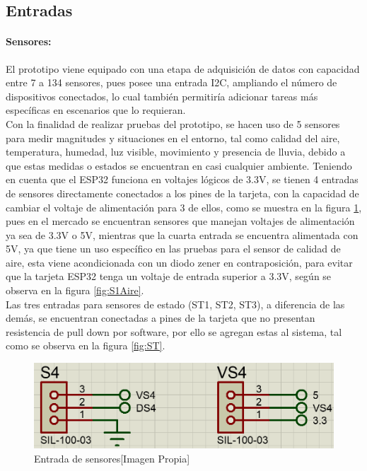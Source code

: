 	\subsection{Entradas}
	\paragraph{Sensores:}
		El prototipo viene equipado con una etapa de adquisición de datos con capacidad entre 7 a 134 sensores, pues posee una entrada I2C, ampliando el número de dispositivos conectados, lo cual también permitiría adicionar tareas más específicas en escenarios que lo requieran.\\
		
		Con la finalidad de realizar pruebas del prototipo, se hacen uso de 5 sensores para medir magnitudes y situaciones en el entorno, tal como calidad del aire, temperatura, humedad, luz visible, movimiento y presencia de lluvia, debido a que estas medidas o estados se encuentran en casi cualquier ambiente. Teniendo en cuenta que el ESP32 funciona en voltajes lógicos de 3.3V, se tienen 4 entradas de sensores directamente conectados a los pines de la tarjeta, con la capacidad de cambiar el voltaje de alimentación para 3 de ellos, como se muestra en la figura \ref{fig:SVS}, pues en el mercado se encuentran sensores que manejan voltajes de alimentación ya sea de 3.3V o 5V, mientras que la cuarta entrada se encuentra alimentada con 5V, ya que tiene un uso específico en las pruebas para el sensor de calidad de aire, esta viene acondicionada con un diodo zener en contraposición, para evitar que la tarjeta ESP32 tenga un voltaje de entrada superior a 3.3V, según se observa en la figura \ref{fig:S1Aire}.\\
		
		Las tres entradas para sensores de estado (ST1, ST2, ST3), a diferencia de las demás, se encuentran conectadas a pines de la tarjeta que no presentan resistencia de pull down por software, por ello se agregan estas al sistema, tal como se observa en la figura \ref{fig:ST}.\\
		
		\begin{figure}[H]
			\centering
			\caption{Entrada de sensores[Imagen Propia]}
			\label{fig:SVS}
			\includegraphics[width=0.7\linewidth]{Imagenes/SVS}
		\end{figure}
	
